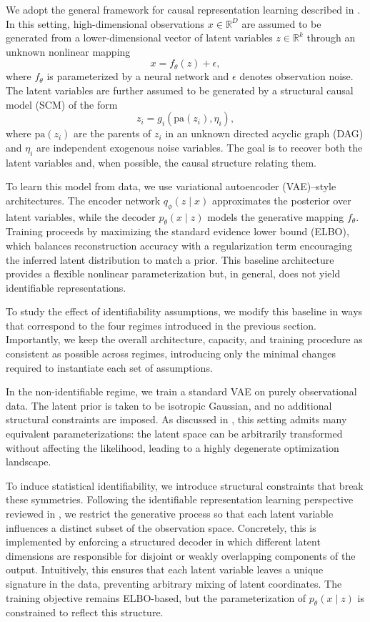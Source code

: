 \documentclass{article} %
\begin{document}
We adopt the general framework for causal representation learning described in \citet{Moran2026CRLFramework}. In this setting, high-dimensional observations $x \in \mathbb{R}^D$ are assumed to be generated from a lower-dimensional vector of latent variables $z \in \mathbb{R}^k$ through an unknown nonlinear mapping
\[
x = f_\theta(z) + \epsilon,
\]
where $f_\theta$ is parameterized by a neural network and $\epsilon$ denotes observation noise. The latent variables are further assumed to be generated by a structural causal model (SCM) of the form
\[
z_i = g_i(\mathrm{pa}(z_i), \eta_i),
\]
where $\mathrm{pa}(z_i)$ are the parents of $z_i$ in an unknown directed acyclic graph (DAG) and $\eta_i$ are independent exogenous noise variables. The goal is to recover both the latent variables and, when possible, the causal structure relating them.

To learn this model from data, we use variational autoencoder (VAE)–style architectures. The encoder network $q_\phi(z \mid x)$ approximates the posterior over latent variables, while the decoder $p_\theta(x \mid z)$ models the generative mapping $f_\theta$. Training proceeds by maximizing the standard evidence lower bound (ELBO), which balances reconstruction accuracy with a regularization term encouraging the inferred latent distribution to match a prior. This baseline architecture provides a flexible nonlinear parameterization but, in general, does not yield identifiable representations.

To study the effect of identifiability assumptions, we modify this baseline in ways that correspond to the four regimes introduced in the previous section. Importantly, we keep the overall architecture, capacity, and training procedure as consistent as possible across regimes, introducing only the minimal changes required to instantiate each set of assumptions.

In the non-identifiable regime, we train a standard VAE on purely observational data. The latent prior is taken to be isotropic Gaussian, and no additional structural constraints are imposed. As discussed in \citet{Moran2026CRLFramework}, this setting admits many equivalent parameterizations: the latent space can be arbitrarily transformed without affecting the likelihood, leading to a highly degenerate optimization landscape.

To induce statistical identifiability, we introduce structural constraints that break these symmetries. Following the identifiable representation learning perspective reviewed in \citet{Moran2026CRLFramework}, we restrict the generative process so that each latent variable influences a distinct subset of the observation space. Concretely, this is implemented by enforcing a structured decoder in which different latent dimensions are responsible for disjoint or weakly overlapping components of the output. Intuitively, this ensures that each latent variable leaves a unique signature in the data, preventing arbitrary mixing of latent coordinates. The training objective remains ELBO-based, but the parameterization of $p_\theta(x \mid z)$ is constrained to reflect this structure.
\end{document}
